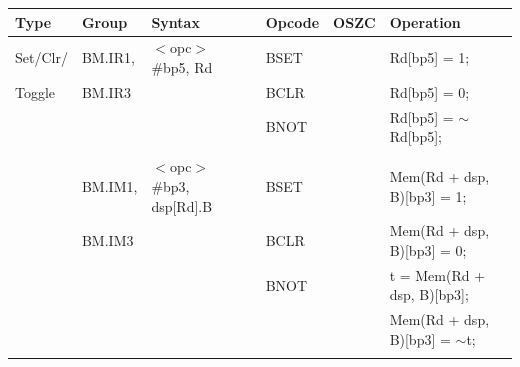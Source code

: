 \begin{table}
\vspace{0.5cm}

\begin{subtable}{\linewidth}
\begin{center}
\scriptsize
\setlength{\tabcolsep}{4pt}
\begin{tabular}{llllll}
\hline
Type               & Group             & Syntax                                & Opcode            & OSZC              & Operation                                                                     \\ \hline
Set/Clr/           & BM.IR1,           & $<$opc$>$ \#bp5, Rd                   & BSET              & \flags{----}      & Rd[bp5] = 1;                                                                  \\
Toggle             & BM.IR3            &                                       & BCLR              & \flags{----}      & Rd[bp5] = 0;                                                                  \\
                   &                   &                                       & BNOT              & \flags{----}      & Rd[bp5] = $\sim$Rd[bp5];                                                      \\
                   &                   &                                       &                   &                   &                                                                               \\
                   & BM.IM1,           & $<$opc$>$ \#bp3, dsp[Rd].B            & BSET              & \flags{----}      & Mem(Rd + dsp, B)[bp3] = 1;                                                    \\
                   & BM.IM3            &                                       & BCLR              & \flags{----}      & Mem(Rd + dsp, B)[bp3] = 0;                                                    \\
                   &                   &                                       & BNOT              & \flags{----}      & t = Mem(Rd + dsp, B)[bp3];                                                    \\
                   &                   &                                       &                   &                   & Mem(Rd + dsp, B)[bp3] = $\sim$t;                                              \\
                   &                   &                                       &                   &                   &                                                                               \\

\end{tabular}
\end{center}
\end{subtable}
\end{table}
